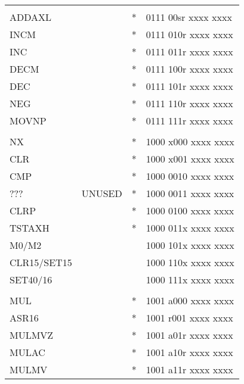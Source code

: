 \documentclass[oneside,english,a4paper,10pt,oneside,openany,final]{memoir}
\begin{document}
\begin{center}
\begin{longtable}{TllT}
            &          &    &                                         \\
ADDAXL      &          & *  & 0111 00sr xxxx xxxx                     \\
INCM        &          & *  & 0111 010r xxxx xxxx                     \\
INC         &          & *  & 0111 011r xxxx xxxx                     \\
DECM        &          & *  & 0111 100r xxxx xxxx                     \\
DEC         &          & *  & 0111 101r xxxx xxxx                     \\
NEG         &          & *  & 0111 110r xxxx xxxx                     \\
MOVNP       &          & *  & 0111 111r xxxx xxxx                     \\
            &          &    &                                         \\
NX          &          & *  & 1000 x000 xxxx xxxx                     \\
CLR         &          & *  & 1000 x001 xxxx xxxx                     \\
CMP         &          & *  & 1000 0010 xxxx xxxx                     \\
???         & UNUSED   & *  & 1000 0011 xxxx xxxx                     \\
CLRP        &          & *  & 1000 0100 xxxx xxxx                     \\
TSTAXH      &          & *  & 1000 011x xxxx xxxx                     \\
M0/M2       &          &    & 1000 101x xxxx xxxx                     \\
CLR15/SET15 &          &    & 1000 110x xxxx xxxx                     \\
SET40/16    &          &    & 1000 111x xxxx xxxx                     \\
            &          &    &                                         \\
MUL         &          & *  & 1001 a000 xxxx xxxx                     \\
ASR16       &          & *  & 1001 r001 xxxx xxxx                     \\
MULMVZ      &          & *  & 1001 a01r xxxx xxxx                     \\
MULAC       &          & *  & 1001 a10r xxxx xxxx                     \\
MULMV       &          & *  & 1001 a11r xxxx xxxx                     \\

\end{longtable}
\end{center}
\end{document}
